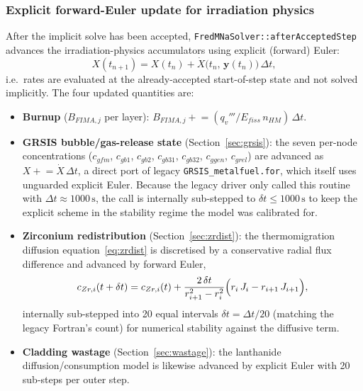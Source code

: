 \begin{refsection}
\subsubsection{Explicit forward-Euler update for irradiation physics}
\label{sec:mna_forward_euler}

After the implicit solve has been accepted, \texttt{FredMNaSolver::afterAcceptedStep} advances the irradiation-physics accumulators using explicit (forward) Euler:
\begin{equation}
  X(t_{n+1}) = X(t_n) + \dot{X}\bigl(t_n,\,\mathbf{y}(t_n)\bigr)\,\Delta t,
  \label{eq:mna_fwd_euler}
\end{equation}
i.e.\ rates are evaluated at the already-accepted start-of-step state and not solved implicitly.  The four updated quantities are:
\begin{itemize}
\item \textbf{Burnup} ($B_{FIMA,j}$ per layer): $B_{FIMA,j} \mathrel{+}= (q_v''' / E_{fiss}\,n_{HM})\,\Delta t$.
\item \textbf{GRSIS bubble/gas-release state} (Section~\ref{sec:grsis}): the seven per-node concentrations ($c_{gfm}$, $c_{gb1}$, $c_{gb2}$, $c_{gb31}$, $c_{gb32}$, $c_{ggen}$, $c_{grel}$) are advanced as $X \mathrel{+}= \dot X\,\Delta t$, a direct port of legacy \texttt{GRSIS\_metalfuel.for}, which itself uses unguarded explicit Euler.  Because the legacy driver only called this routine with $\Delta t \approx 1000\,\mathrm{s}$, the call is internally sub-stepped to $\delta t \leq 1000\,\mathrm{s}$ to keep the explicit scheme in the stability regime the model was calibrated for.
\item \textbf{Zirconium redistribution} (Section~\ref{sec:zrdist}): the thermomigration diffusion equation~\eqref{eq:zrdist} is discretised by a conservative radial flux difference and advanced by forward Euler,
    \begin{equation}
      c_{Zr,i}(t+\delta t) = c_{Zr,i}(t) +
        \frac{2\,\delta t}{r_{i+1}^2 - r_i^2}
        \Bigl(r_i\,J_{i} - r_{i+1}\,J_{i+1}\Bigr),
      \label{eq:mna_zr_fwd_euler}
    \end{equation}
internally sub-stepped into 20 equal intervals $\delta t = \Delta t / 20$ (matching the legacy Fortran's count) for numerical stability against the diffusive term.
\item \textbf{Cladding wastage} (Section~\ref{sec:wastage}): the lanthanide diffusion/consumption model is likewise advanced by explicit Euler with 20 sub-steps per outer step.
\end{itemize}


\end{refsection}
